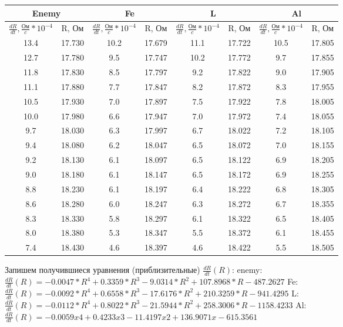 \documentclass[12pt,a4paper]{article}
\begin{document}
\begin{center}
\begin{tabular}{|c|c|c|c|c|c|c|c|}
\hline 
\multicolumn{2}{|c|}{Enemy} & \multicolumn{2}{|c|}{Fe} & \multicolumn{2}{|c|}{L} & \multicolumn{2}{|c|}{Al} \\ 
\hline  
$\frac{dR}{dt}, \frac{\text{Ом}}{c}*10^{-4}$ & R, Ом & $\frac{dR}{dt}, \frac{\text{Ом}}{c}*10^{-4}$ & R, Ом & $\frac{dR}{dt}, \frac{\text{Ом}}{c}*10^{-4}$ & R, Ом & $\frac{dR}{dt}, \frac{\text{Ом}}{c}*10^{-4}$ & R, Ом \\ 
\hline 
13.4 & 17.730 & 10.2 & 17.679 & 11.1 & 17.722 & 10.5 & 17.805 \\ 
\hline 
12.7 & 17.780 & 9.5 & 17.747 & 10.2 & 17.772 & 9.7 & 17.855 \\ 
\hline 
11.8 & 17.830 & 8.5 & 17.797 & 9.2 & 17.822 & 9.0 & 17.905 \\ 
\hline 
11.1 & 17.880 & 7.7 & 17.847 & 8.2 & 17.872 & 8.3 & 17.955 \\ 
\hline 
10.5 & 17.930 & 7.0 & 17.897 & 7.5 & 17.922 & 7.8 & 18.005 \\ 
\hline 
10.0 & 17.980 & 6.6 & 17.947 & 7.0 & 17.972 & 7.4 & 18.055 \\ 
\hline 
9.7 & 18.030 & 6.3 & 17.997 & 6.7 & 18.022 & 7.2 & 18.105 \\ 
\hline 
9.4 & 18.080 & 6.2 & 18.047 & 6.5 & 18.072 & 7.0 & 18.155 \\ 
\hline 
9.2 & 18.130 & 6.1 & 18.097 & 6.5 & 18.122 & 6.9 & 18.205 \\ 
\hline 
9.0 & 18.180 & 6.1 & 18.147 & 6.5 & 18.172 & 6.9 & 18.255 \\ 
\hline 
8.8 & 18.230 & 6.1 & 18.197 & 6.4 & 18.222 & 6.8 & 18.305 \\ 
\hline 
8.6 & 18.280 & 6.0 & 18.247 & 6.3 & 18.272 & 6.7 & 18.355 \\ 
\hline 
8.3 & 18.330 & 5.8 & 18.297 & 6.1 & 18.322 & 6.5 & 18.405 \\ 
\hline 
8.0 & 18.380 & 5.3 & 18.347 & 5.5 & 18.372 & 6.1 & 18.455 \\ 
\hline 
7.4 & 18.430 & 4.6 & 18.397 & 4.6 & 18.422 & 5.5 & 18.505 \\ 
\hline 
\end{tabular} 
\end{center}

Запишем получившиеся уравнения (приблизительные) $\frac{dR}{dt}(R)$: \hfill \break
enemy: $\frac{dR}{dt}(R) = -0.0047*R^4 + 0.3359*R^3 - 9.0314*R^2 + 107.8968*R - 487.2627$ \hfill \break
Fe: $\frac{dR}{dt}(R) = -0.0092*R^4 + 0.6558*R^3 - 17.6176*R^2 + 210.3259*R - 941.4295$ \hfill \break
L: $\frac{dR}{dt}(R) = -0.0112*R^4 + 0.8022*R^3 - 21.5944*R^2 + 258.3006*R - 1158.4233$ \hfill \break
Al: $\frac{dR}{dt}(R) = -0.0059x4 + 0.4233x3 - 11.4197x2 + 136.9071x - 615.3561$
\end{document}
